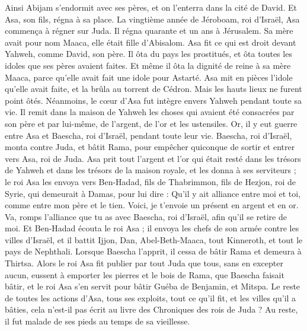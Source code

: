 \begin{multicols}{2}
Ainsi Abijam s'endormit avec ses pères, et on l'enterra dans la cité de David. Et Asa, son fils, régna à sa place.
La vingtième année de Jéroboam, roi d'Israël, Asa commença à régner sur Juda.
Il régna quarante et un ans à Jérusalem. Sa mère avait pour nom Maaca, elle était fille d'Abisalom.
Asa fit ce qui est droit devant Yahweh, comme David, son père.
Il ôta du pays les prostitués, et ôta toutes les idoles que ses pères avaient faites.
Et même il ôta la dignité de reine à sa mère Maaca, parce qu'elle avait fait une idole pour Astarté. Asa mit en pièces l’idole qu'elle avait faite, et la brûla au torrent de Cédron.
Mais les hauts lieux ne furent point ôtés. Néanmoins, le cœur d'Asa fut intègre envers Yahweh pendant toute sa vie.
Il remit dans la maison de Yahweh les choses qui avaient été consacrées par son père et par lui-même, de l'argent, de l'or et les ustensiles.
Or, il y eut guerre entre Asa et Baescha, roi d'Israël, pendant toute leur vie.
Baescha, roi d'Israël, monta contre Juda, et bâtit Rama, pour empêcher quiconque de sortir et entrer vers Asa, roi de Juda.
Asa prit tout l'argent et l'or qui était resté dans les trésors de Yahweh et dans les trésors de la maison royale, et les donna à ses serviteurs ; le roi Asa les envoya vers Ben-Hadad, fils de Thabrimmon, fils de Hezjon, roi de Syrie, qui demeurait à Damas, pour lui dire :
Qu’il y ait alliance entre moi et toi, comme entre mon père et le tien. Voici, je t'envoie un présent en argent et en or. Va, romps l'alliance que tu as avec Baescha, roi d'Israël, afin qu'il se retire de moi.
Et Ben-Hadad écouta le roi Asa ; il envoya les chefs de son armée contre les villes d'Israël, et il battit Ijjon, Dan, Abel-Beth-Maaca, tout Kinneroth, et tout le pays de Nephthali.
Lorsque Baescha l’apprit, il cessa de bâtir Rama et demeura à Thirtsa.
Alors le roi Asa fit publier par tout Juda que tous, sans en excepter aucun, eussent à emporter les pierres et le bois de Rama, que Baescha faisait bâtir, et le roi Asa s’en servit pour bâtir Guéba de Benjamin, et Mitspa.
Le reste de toutes les actions d'Asa, tous ses exploits, tout ce qu'il fit, et les villes qu'il a bâties, cela n'est-il pas écrit au livre des Chroniques des rois de Juda ? Au reste, il fut malade de ses pieds au temps de sa vieillesse.

\end{multicols}
